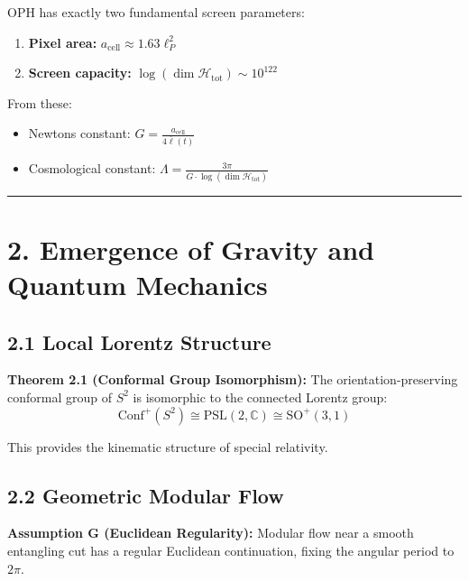 OPH has exactly two fundamental screen parameters:

\begin{enumerate}
\def\labelenumi{\arabic{enumi}.}
\tightlist
\item
  \textbf{Pixel area:} \(a_{\text{cell}} \approx 1.63 \ell_P^2\)
\item
  \textbf{Screen capacity:} \(\log(\dim \mathcal{H}_{\text{tot}}) \sim 10^{122}\)
\end{enumerate}

From these:

\begin{itemize}
\tightlist
\item
  Newton\textquotesingle s constant: \(G = \frac{a_{\text{cell}}}{4\bar{\ell}(t)}\)
\item
  Cosmological constant: \(\Lambda = \frac{3\pi}{G \cdot \log(\dim \mathcal{H}_{\text{tot}})}\)
\end{itemize}

\begin{center}\rule{0.5\linewidth}{0.5pt}\end{center}

\section{2. Emergence of Gravity and Quantum Mechanics}\label{2-emergence-of-gravity-and-quantum-mechanics}

\subsection{2.1 Local Lorentz Structure}\label{21-local-lorentz-structure}

\textbf{Theorem 2.1 (Conformal Group Isomorphism):} The orientation-preserving conformal group of \(S^2\) is isomorphic to the connected Lorentz group: \[\text{Conf}^+(S^2) \cong \text{PSL}(2,\mathbb{C}) \cong \text{SO}^+(3,1)\]

This provides the kinematic structure of special relativity.

\subsection{2.2 Geometric Modular Flow}\label{22-geometric-modular-flow}

\textbf{Assumption G (Euclidean Regularity):} Modular flow near a smooth entangling cut has a regular Euclidean continuation, fixing the angular period to \(2\pi\).

